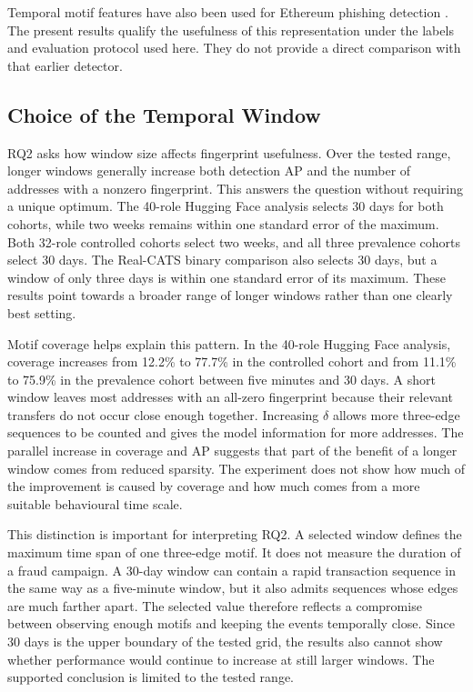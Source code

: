 \documentclass{thesisclass}
\begin{document}
Temporal motif features have also been used for Ethereum phishing detection
\citep{wang2023temporal}. The present results qualify the usefulness of this
representation under the labels and evaluation protocol used here. They do not
provide a direct comparison with that earlier detector.

\subsection{Choice of the Temporal Window}

RQ2 asks how window size affects fingerprint usefulness. Over the tested range,
longer windows generally increase both detection AP and the number of addresses
with a nonzero fingerprint. This answers the question without requiring a unique
optimum. The
40-role Hugging Face analysis selects 30 days for both cohorts, while two weeks
remains within one standard error of the maximum. Both 32-role controlled
cohorts select two weeks, and all three prevalence cohorts select 30 days. The
Real-CATS binary
comparison also selects 30 days, but a window of only three days is within one
standard error of its maximum. These results point towards a broader range of
longer windows rather than one clearly best setting.

Motif coverage helps explain this pattern. In the 40-role Hugging Face analysis,
coverage increases from 12.2\% to 77.7\% in the controlled cohort and from
11.1\% to 75.9\% in the prevalence cohort between five minutes and 30 days.
A short window leaves most
addresses with an all-zero fingerprint because their relevant transfers do not
occur close enough together. Increasing $\delta$ allows more three-edge
sequences to be counted and gives the model information for more addresses. The
parallel increase in coverage and AP suggests that part of the benefit of a
longer window comes from reduced sparsity. The experiment does not show how much
of the improvement is caused by coverage and how much comes from a more suitable
behavioural time scale.

This distinction is important for interpreting RQ2. A selected window defines
the maximum time span of one three-edge motif. It does not measure the duration
of a fraud campaign. A 30-day window can contain a rapid transaction sequence in
the same way as a five-minute window, but it also admits sequences whose edges
are much farther apart. The selected value therefore reflects a compromise
between observing enough motifs and keeping the events temporally close. Since
30 days is the upper boundary of the tested grid, the results also cannot show
whether performance would continue to increase at still larger windows. The
supported conclusion is limited to the tested range.
\end{document}

